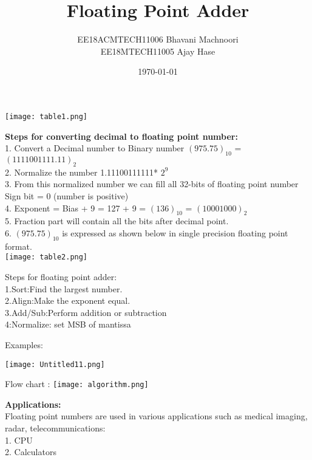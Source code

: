\documentclass{beamer}
\title{Floating Point Adder}
\author{EE18ACMTECH11006    Bhavani Machnoori   \\ 
EE18MTECH11005   Ajay Hase}
\date{\today}
\begin{document}
\begin{frame}
\titlepage
\end{frame}

\begin{frame}
\texttt{[image: table1.png]}

\textbf{Steps for converting decimal to floating point number:} \\

1. Convert a Decimal number to Binary number $(975.75)_10$ = $(1111001111.11)_2 $ \\
2. Normalize the number 1.11100111111* $2^9$\\
3. From this normalized number we can fill all 32-bits of floating point number
Sign bit = 0 (number is positive) \\
4. Exponent = Bias + 9 = 127 + 9 = $(136)_10$ = $(1000 1000)_2$ \\
5. Fraction part will contain all the bits after decimal point. \\
6. $(975.75)_10$ is expressed as shown below in single precision floating point format.\\
\texttt{[image: table2.png]}
\end{frame}
\begin{frame}
Steps for floating point adder:\\
1.Sort:Find the largest number.\\
2.Align:Make the exponent equal.\\
3.Add/Sub:Perform addition or subtraction\\
4:Normalize: set MSB of mantissa  
\end{frame}
\begin{frame}
Examples:

\texttt{[image: Untitled11.png]}
\end{frame}

\begin{frame}


Flow chart : 
\texttt{[image: algorithm.png]}

\end{frame}
\begin{frame}
\textbf{Applications:
}  \\

Floating point numbers are used in various applications such as medical
imaging, radar, telecommunications:\\
1. CPU \\
2. Calculators
\end{frame}
\end{document}
